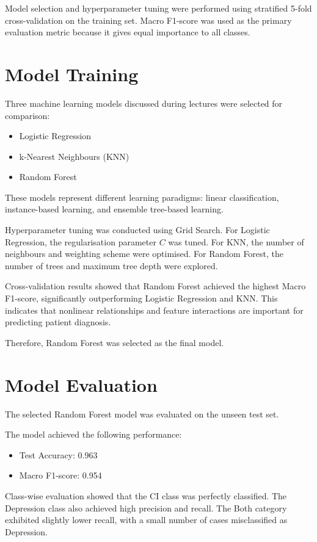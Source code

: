 \documentclass[11pt]{article}
\begin{document}
Model selection and hyperparameter tuning were performed using stratified 5-fold cross-validation on the training set. Macro F1-score was used as the primary evaluation metric because it gives equal importance to all classes.

\section{Model Training}

Three machine learning models discussed during lectures were selected for comparison:

\begin{itemize}
\item Logistic Regression
\item k-Nearest Neighbours (KNN)
\item Random Forest
\end{itemize}

These models represent different learning paradigms: linear classification, instance-based learning, and ensemble tree-based learning.

Hyperparameter tuning was conducted using Grid Search. For Logistic Regression, the regularisation parameter $C$ was tuned. For KNN, the number of neighbours and weighting scheme were optimised. For Random Forest, the number of trees and maximum tree depth were explored.

Cross-validation results showed that Random Forest achieved the highest Macro F1-score, significantly outperforming Logistic Regression and KNN. This indicates that nonlinear relationships and feature interactions are important for predicting patient diagnosis.

Therefore, Random Forest was selected as the final model.

\section{Model Evaluation}

The selected Random Forest model was evaluated on the unseen test set.

The model achieved the following performance:

\begin{itemize}
\item Test Accuracy: 0.963
\item Macro F1-score: 0.954
\end{itemize}

Class-wise evaluation showed that the CI class was perfectly classified. The Depression class also achieved high precision and recall. The Both category exhibited slightly lower recall, with a small number of cases misclassified as Depression.
\end{document}

